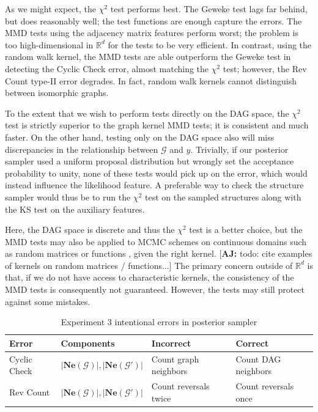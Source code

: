 \documentclass{article}
\newcommand{\ajsay}[1]{[\textcolor{red!70!black}{\textbf{AJ: }}\textcolor{red!50!black}{#1}]}
\begin{document}
As we might expect, the $\chi^{2}$ test performs best. The Geweke test lags far behind, but does reasonably well; the test functions are enough capture the errors. The MMD tests using the adjacency matrix features perform worst; the problem is too high-dimensional in $\mathbb{R}^{d}$ for the tests to be very efficient. In contrast, using the random walk kernel, the MMD tests are able outperform the Geweke test in detecting the Cyclic Check error, almost matching the $\chi^{2}$ test; however, the Rev Count type-II error degrades. In fact, random walk kernels cannot distinguish between isomorphic graphs.

To the extent that we wish to perform tests directly on the DAG space, the $\chi^{2}$ test is strictly superior to the graph kernel MMD tests; it is consistent and much faster. On the other hand, testing only on the DAG space also will miss discrepancies in the relationship between $\mathcal{G}$ and $y$. Trivially, if our posterior sampler used a uniform proposal distribution but wrongly set the acceptance probability to unity, none of these tests would pick up on the error, which would instead influence the likelihood feature. A preferable way to check the structure sampler would thus be to run the $\chi^{2}$ test on the sampled structures along with the KS test on the auxiliary features.

Here, the DAG space is discrete and thus the $\chi^{2}$ test is a better choice, but the MMD tests may also be applied to MCMC schemes on continuous domains such as random matrices \citep{beskos_mcmc_2021} or functions \citep{jeltsch_mcmc_2009}, given the right kernel. \ajsay{todo: cite examples of kernels on random matrices / functions...} 
The primary concern outside of $\mathbb{R}^{d}$ is that, if we do not have access to characteristic kernels, the consistency of the MMD tests is consequently not guaranteed. However, the tests may still protect against some mistakes.

\begin{table}
    \caption{Experiment 3 intentional errors in posterior sampler}
    \label{tab:ex3_errors}
    \centering
    \begin{tabular}{l|l|l|l}
    \toprule
          Error & Components & Incorrect & Correct \\
    \midrule  
         Cyclic Check & $|\mathbf{Ne}(\mathcal{G})|, |\mathbf{Ne}(\mathcal{G}')|$ & Count graph neighbors & Count DAG neighbors \\
         Rev Count & $|\mathbf{Ne}(\mathcal{G})|, |\mathbf{Ne}(\mathcal{G}')|$ & Count reversals twice & Count reversals once \\
    \bottomrule
    \end{tabular}
\end{table}
\end{document}
